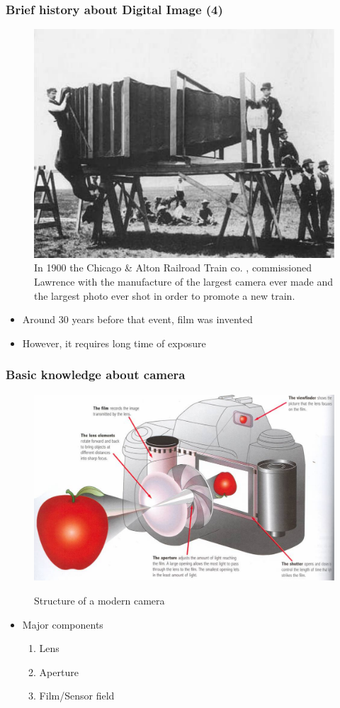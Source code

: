 \begin{frame}
 \frametitle{Brief history about Digital Image (4)}
\vspace{-0.1in}
\begin{figure}
\begin{center}
	\includegraphics[width=0.53\linewidth]{./figs/biggest_camera.pdf}
\end{center}
\caption{In 1900 the Chicago \& Alton Railroad Train co. , commissioned Lawrence with the manufacture of the largest camera ever made and the largest photo ever shot in order to promote a new train.}
\end{figure}
\vspace{-0.1in}
\begin{itemize}
	\item {Around 30 years before that event, film was invented}
	\item {However, it requires long time of exposure}
\end{itemize}
\end{frame}

\begin{frame}
 \frametitle{Basic knowledge about camera}
  \vspace{-0.1in}
\begin{figure}
\begin{center}
	{\includegraphics[width=0.55\linewidth]{./figs/camera.pdf}}
\end{center}
\caption{Structure of a modern camera}
\end{figure}

\begin{itemize}
	\item {Major components}
	\begin{enumerate}
		\item {Lens}
		\item {Aperture}
		\item {Film/Sensor field}
	\end{enumerate}
\end{itemize}

\end{frame}


